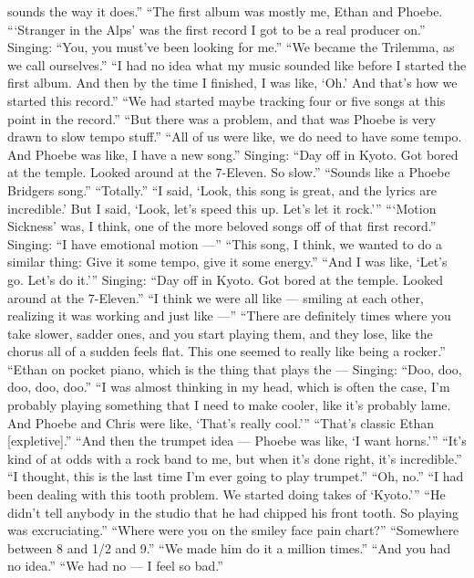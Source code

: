 \begin{itemize}
  sounds the way it does.'' ``The first album was mostly me, Ethan and
  Phoebe. ```Stranger in the Alps' was the first record I got to be a
  real producer on.'' Singing: ``You, you must've been looking for me.''
  ``We became the Trilemma, as we call ourselves.'' ``I had no idea what
  my music sounded like before I started the first album. And then by
  the time I finished, I was like, `Oh.' And that's how we started this
  record.'' ``We had started maybe tracking four or five songs at this
  point in the record.'' ``But there was a problem, and that was Phoebe
  is very drawn to slow tempo stuff.'' ``All of us were like, we do need
  to have some tempo. And Phoebe was like, I have a new song.'' Singing:
  ``Day off in Kyoto. Got bored at the temple. Looked around at the
  7-Eleven. So slow.'' ``Sounds like a Phoebe Bridgers song.''
  ``Totally.'' ``I said, `Look, this song is great, and the lyrics are
  incredible.' But I said, `Look, let's speed this up. Let's let it
  rock.''' ```Motion Sickness' was, I think, one of the more beloved
  songs off of that first record.'' Singing: ``I have emotional motion
  ---'' ``This song, I think, we wanted to do a similar thing: Give it
  some tempo, give it some energy.'' ``And I was like, `Let's go. Let's
  do it.''' Singing: ``Day off in Kyoto. Got bored at the temple. Looked
  around at the 7-Eleven.'' ``I think we were all like --- smiling at
  each other, realizing it was working and just like ---'' ``There are
  definitely times where you take slower, sadder ones, and you start
  playing them, and they lose, like the chorus all of a sudden feels
  flat. This one seemed to really like being a rocker.'' ``Ethan on
  pocket piano, which is the thing that plays the --- Singing: ``Doo,
  doo, doo, doo, doo.'' ``I was almost thinking in my head, which is
  often the case, I'm probably playing something that I need to make
  cooler, like it's probably lame. And Phoebe and Chris were like,
  `That's really cool.''' ``That's classic Ethan {[}expletive{]}.''
  ``And then the trumpet idea --- Phoebe was like, `I want horns.'''
  ``It's kind of at odds with a rock band to me, but when it's done
  right, it's incredible.'' ``I thought, this is the last time I'm ever
  going to play trumpet.'' ``Oh, no.'' ``I had been dealing with this
  tooth problem. We started doing takes of `Kyoto.''' ``He didn't tell
  anybody in the studio that he had chipped his front tooth. So playing
  was excruciating.'' ``Where were you on the smiley face pain chart?''
  ``Somewhere between 8 and 1/2 and 9.'' ``We made him do it a million
  times.'' ``And you had no idea.'' ``We had no --- I feel so bad.''

\end{itemize}
